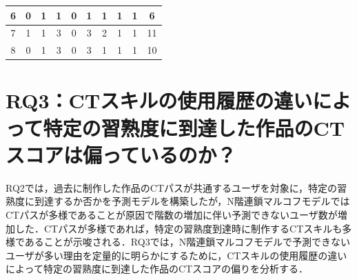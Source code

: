 \documentclass[submit]{ipsj}
\begin{document}
\begin{table}[t]
{\begin{tabular}{c|c|cccccccc}
6                   & 0                                           & \multicolumn{1}{c|}{1} & \multicolumn{1}{c|}{1} & \multicolumn{1}{c|}{0} & \multicolumn{1}{c|}{1} & \multicolumn{1}{c|}{1} & \multicolumn{1}{c|}{1} & \multicolumn{1}{c|}{1} & 6  \\ \hline
7                   & 1                                           & \multicolumn{1}{c|}{1} & \multicolumn{1}{c|}{3} & \multicolumn{1}{c|}{0} & \multicolumn{1}{c|}{3} & \multicolumn{1}{c|}{2} & \multicolumn{1}{c|}{1} & \multicolumn{1}{c|}{1} & 11  \\ \hline
8                   & 0                                           & \multicolumn{1}{c|}{1} & \multicolumn{1}{c|}{3} & \multicolumn{1}{c|}{0} & \multicolumn{1}{c|}{3} & \multicolumn{1}{c|}{1} & \multicolumn{1}{c|}{1} & \multicolumn{1}{c|}{1} & 10  \\ \hline
\end{tabular}
}
  \end{table}







\section{RQ3：CTスキルの使用履歴の違いによって特定の習熟度に到達した作品のCTスコアは偏っているのか？}
\label{sec:rq3}

RQ2では，過去に制作した作品のCTパスが共通するユーザを対象に，特定の習熟度に到達するか否かを予測モデルを構築したが，N階連鎖マルコフモデルではCTパスが多様であることが原因で階数の増加に伴い予測できないユーザ数が増加した．CTパスが多様であれば，特定の習熟度到達時に制作するCTスキルも多様であることが示唆される．RQ3では，N階連鎖マルコフモデルで予測できないユーザが多い理由を定量的に明らかにするために，CTスキルの使用履歴の違いによって特定の習熟度に到達した作品のCTスコアの偏りを分析する．
\end{document}

